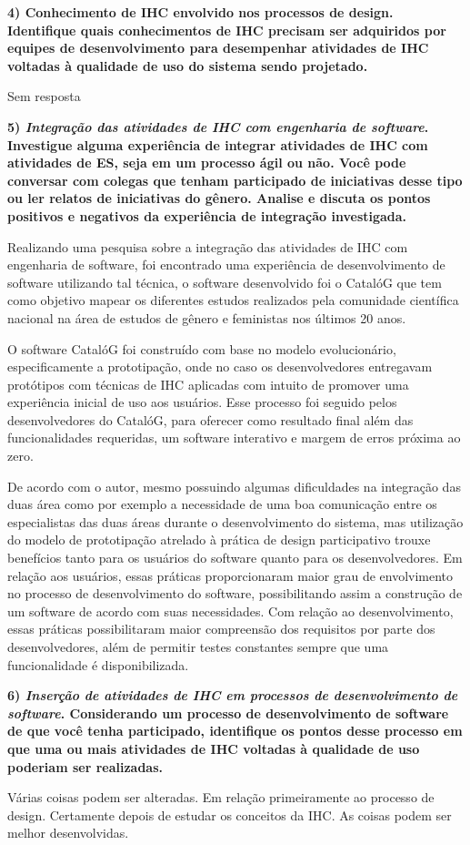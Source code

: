 \documentclass[
	article,			%
	11pt,				%
	oneside,			%
	a4paper,			%
	english,			%
	brazil,				%
	sumario=tradicional
	]{abntex2}
\begin{document}
\textbf{4) Conhecimento de IHC envolvido nos processos de design. Identifique quais conhecimentos de IHC precisam ser adquiridos por equipes de desenvolvimento para desempenhar atividades de IHC voltadas à qualidade de uso do sistema sendo projetado.}

Sem resposta

\textbf{5) \textit{Integração das atividades de IHC com engenharia de software}. Investigue alguma experiência de integrar atividades de IHC com atividades de ES, seja em um processo ágil ou não. Você pode conversar com colegas que tenham participado de iniciativas desse tipo ou ler relatos de iniciativas do gênero. Analise e discuta os pontos positivos e negativos da experiência de integração investigada.}

Realizando uma pesquisa sobre a integração das atividades de IHC com engenharia de software, foi encontrado uma experiência de desenvolvimento de software utilizando tal técnica, o software desenvolvido foi o CatalóG que tem como objetivo mapear os diferentes estudos realizados pela comunidade científica nacional na área de estudos de gênero e feministas nos últimos 20 anos.

O software CatalóG foi construído com base no modelo evolucionário, especificamente a prototipação, onde no caso os desenvolvedores entregavam protótipos com técnicas de IHC aplicadas com intuito de promover uma experiência inicial de uso aos usuários. Esse processo foi seguido pelos desenvolvedores do CatalóG, para oferecer como resultado final além das funcionalidades requeridas, um software interativo e margem de erros próxima ao zero.

De acordo com o autor, mesmo possuindo algumas dificuldades na integração das duas área como por exemplo a necessidade de uma boa comunicação entre os especialistas das duas áreas durante o desenvolvimento do sistema, mas  utilização do modelo de prototipação atrelado à prática de design participativo trouxe benefícios tanto para os usuários do software quanto para os desenvolvedores. Em relação aos usuários, essas práticas proporcionaram maior grau de envolvimento no processo de desenvolvimento do software, possibilitando assim a construção de um software de acordo com suas necessidades. Com relação ao desenvolvimento, essas práticas possibilitaram maior compreensão dos requisitos por parte dos desenvolvedores, além de permitir testes constantes sempre que uma funcionalidade é disponibilizada. 

\textbf{6) \textit{Inserção de atividades de IHC em processos de desenvolvimento de software}. Considerando um processo de desenvolvimento de software de que você tenha participado, identifique os pontos desse processo em que uma ou mais atividades de IHC voltadas à qualidade de uso poderiam ser realizadas.}

Várias coisas podem ser alteradas. Em relação primeiramente ao processo de design. Certamente depois de estudar os conceitos da IHC. As coisas podem ser melhor desenvolvidas.


\end{document}
